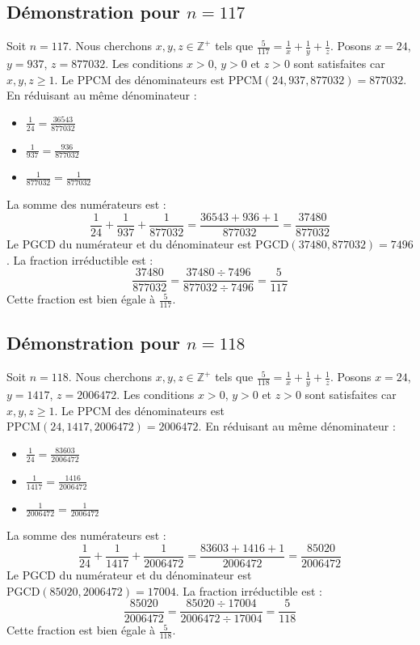 \documentclass[11pt,a4paper]{article}
\begin{document}
\subsection{Démonstration pour $n = 117$}
Soit $n = 117$. Nous cherchons $x, y, z \in \mathbb{Z}^{+}$ tels que $\frac{5}{117} = \frac{1}{x} + \frac{1}{y} + \frac{1}{z}$.
Posons $x = 24$, $y = 937$, $z = 877032$.
Les conditions $x > 0$, $y > 0$ et $z > 0$ sont satisfaites car $x, y, z \geq 1$.
Le PPCM des dénominateurs est $\text{PPCM}(24, 937, 877032) = 877032$.
En réduisant au même dénominateur :
\begin{itemize}
    \item $\frac{1}{24} = \frac{36543}{877032}$
    \item $\frac{1}{937} = \frac{936}{877032}$
    \item $\frac{1}{877032} = \frac{1}{877032}$
\end{itemize}
La somme des numérateurs est :
$$ \frac{1}{24} + \frac{1}{937} + \frac{1}{877032} = \frac{36543 + 936 + 1}{877032} = \frac{37480}{877032} $$
Le PGCD du numérateur et du dénominateur est $\text{PGCD}(37480, 877032) = 7496$.
La fraction irréductible est :
$$ \frac{37480}{877032} = \frac{37480 \div 7496}{877032 \div 7496} = \frac{5}{117} $$
Cette fraction est bien égale à $\frac{5}{117}$.

\subsection{Démonstration pour $n = 118$}
Soit $n = 118$. Nous cherchons $x, y, z \in \mathbb{Z}^{+}$ tels que $\frac{5}{118} = \frac{1}{x} + \frac{1}{y} + \frac{1}{z}$.
Posons $x = 24$, $y = 1417$, $z = 2006472$.
Les conditions $x > 0$, $y > 0$ et $z > 0$ sont satisfaites car $x, y, z \geq 1$.
Le PPCM des dénominateurs est $\text{PPCM}(24, 1417, 2006472) = 2006472$.
En réduisant au même dénominateur :
\begin{itemize}
    \item $\frac{1}{24} = \frac{83603}{2006472}$
    \item $\frac{1}{1417} = \frac{1416}{2006472}$
    \item $\frac{1}{2006472} = \frac{1}{2006472}$
\end{itemize}
La somme des numérateurs est :
$$ \frac{1}{24} + \frac{1}{1417} + \frac{1}{2006472} = \frac{83603 + 1416 + 1}{2006472} = \frac{85020}{2006472} $$
Le PGCD du numérateur et du dénominateur est $\text{PGCD}(85020, 2006472) = 17004$.
La fraction irréductible est :
$$ \frac{85020}{2006472} = \frac{85020 \div 17004}{2006472 \div 17004} = \frac{5}{118} $$
Cette fraction est bien égale à $\frac{5}{118}$.
\end{document}
